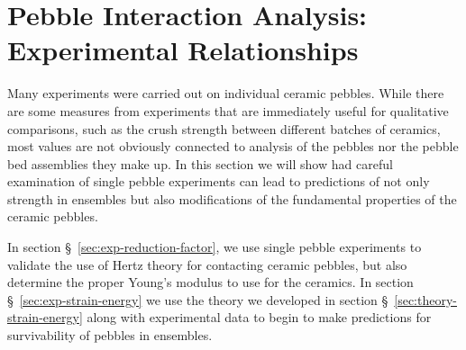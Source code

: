 \chapter{Pebble Interaction Analysis: Experimental Relationships} \label{sec:analysis-experiment}

Many experiments were carried out on individual ceramic pebbles. While there are some measures from experiments that are immediately useful for qualitative comparisons, such as the crush strength between different batches of ceramics, most values are not obviously connected to analysis of the pebbles nor the pebble bed assemblies they make up. In this section we will show had careful examination of single pebble experiments can lead to predictions of not only strength in ensembles but also modifications of the fundamental properties of the ceramic pebbles.

In section \S~\ref{sec:exp-reduction-factor}, we use single pebble experiments to validate the use of Hertz theory for contacting ceramic pebbles, but also determine the proper Young's modulus to use for the ceramics. In section \S~\ref{sec:exp-strain-energy} we use the theory we developed in section \S~\ref{sec:theory-strain-energy} along with experimental data to begin to make predictions for survivability of pebbles in ensembles.





